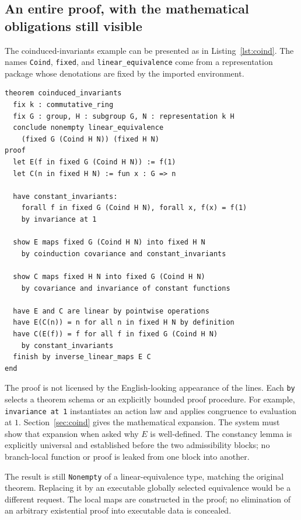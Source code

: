\documentclass[11pt,letterpaper]{article}
\newcommand{\code}[1]{\nolinkurl{#1}}
\theoremstyle{definition}
\theoremstyle{remark}
\begin{document}
\subsection{An entire proof, with the mathematical obligations still visible}
The coinduced-invariants example can be presented as in Listing~\ref{lst:coind}.
The names
\code{Coind}, \code{fixed}, and \code{linear_equivalence} come from a representation
package whose denotations are fixed by the imported environment.
\begin{lstlisting}[float=htbp,caption={Proposed source for the coinduced-invariants equivalence.},captionpos=t,label={lst:coind}]
theorem coinduced_invariants
  fix k : commutative_ring
  fix G : group, H : subgroup G, N : representation k H
  conclude nonempty linear_equivalence
    (fixed G (Coind H N)) (fixed H N)
proof
  let E(f in fixed G (Coind H N)) := f(1)
  let C(n in fixed H N) := fun x : G => n

  have constant_invariants:
    forall f in fixed G (Coind H N), forall x, f(x) = f(1)
    by invariance at 1

  show E maps fixed G (Coind H N) into fixed H N
    by coinduction covariance and constant_invariants

  show C maps fixed H N into fixed G (Coind H N)
    by covariance and invariance of constant functions

  have E and C are linear by pointwise operations
  have E(C(n)) = n for all n in fixed H N by definition
  have C(E(f)) = f for all f in fixed G (Coind H N)
    by constant_invariants
  finish by inverse_linear_maps E C
end
\end{lstlisting}
The proof is not licensed by the English-looking appearance of the lines. Each
\code{by} selects a theorem schema or an explicitly bounded proof procedure.
For example, \code{invariance at 1} instantiates an action law and applies
congruence to evaluation at $1$. Section~\ref{sec:coind} gives the mathematical
expansion. The system must show that expansion when asked why $E$ is
well-defined. The constancy lemma is explicitly universal and established
before the two admissibility blocks; no branch-local function or proof is leaked
from one block into another.

The result is still \code{Nonempty} of a linear-equivalence type, matching the
original theorem. Replacing it by an executable globally selected equivalence
would be a different request. The local maps are constructed in the proof; no
elimination of an arbitrary existential proof into executable data is concealed.
\end{document}

